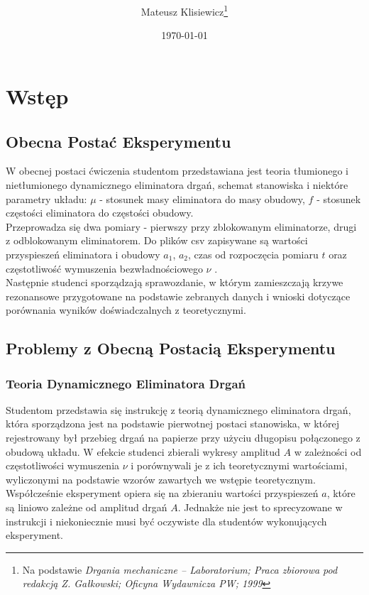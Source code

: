 \documentclass[12pt]{article}
\title{\mytitle \\
  \large \mysubtitle}
\author{Mateusz Klisiewicz\thanks{Na podstawie \textit{Drgania mechaniczne – Laboratorium; Praca zbiorowa pod redakcją Z. Gałkowski; Oficyna Wydawnicza PW; 1999}}}
\date{\today}
\begin{document}
\pagestyle{fancy}
\maketitle
\newpage
\section*{Wstęp}
\subsection*{Obecna Postać Eksperymentu}
W obecnej postaci ćwiczenia studentom przedstawiana jest teoria tłumionego i nietłumionego dynamicznego eliminatora drgań, schemat stanowiska i niektóre parametry układu: $\mu$ - stosunek masy eliminatora do masy obudowy, $f$ - stosunek częstości eliminatora do częstości obudowy. \\Przeprowadza się dwa pomiary - pierwszy przy zblokowanym eliminatorze, drugi z odblokowanym eliminatorem. Do plików csv zapisywane są wartości przyspieszeń eliminatora i obudowy $a_1$, $a_2$, czas od rozpoczęcia pomiaru $t$  oraz częstotliwość wymuszenia bezwładnościowego $\nu$ . \\Następnie studenci sporządzają sprawozdanie, w którym zamieszczają krzywe rezonansowe przygotowane na podstawie zebranych danych i wnioski dotyczące porównania wyników doświadczalnych z teoretycznymi.
\subsection*{Problemy z Obecną Postacią Eksperymentu}
\subsubsection*{Teoria Dynamicznego Eliminatora Drgań}
Studentom przedstawia się instrukcję z teorią dynamicznego eliminatora drgań, która sporządzona jest na podstawie pierwotnej postaci stanowiska, w której rejestrowany był przebieg drgań na papierze przy użyciu długopisu połączonego z obudową układu. W efekcie studenci zbierali wykresy amplitud $A$ w zależności od częstotliwości wymuszenia ${\nu}$ i porównywali je z ich teoretycznymi wartościami, wyliczonymi na podstawie wzorów zawartych we wstępie teoretycznym. \\Współcześnie eksperyment opiera się na zbieraniu wartości przyspieszeń $a$, które są liniowo zależne od amplitud drgań $A$. Jednakże nie jest to sprecyzowane w instrukcji i niekoniecznie musi być oczywiste dla studentów wykonujących eksperyment.
\end{document}

